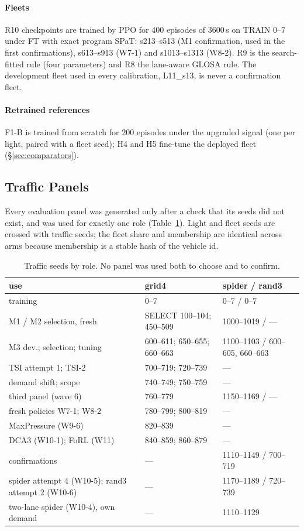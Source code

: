 \paragraph{Fleets} R10 checkpoints are trained by PPO for 400 episodes of 3600\,s on TRAIN 0--7 under FT with exact program SPaT: s213--s513
(M1 confirmation, used in the first confirmations), s613--s913 (W7-1) and s1013--s1313 (W8-2). R9 is the search-fitted rule
(four parameters) and R8 the lane-aware GLOSA rule. The development fleet used in every calibration, L11\_s13, is never a confirmation
fleet.
\paragraph{Retrained references} F1-B is trained from scratch for 200 episodes under the upgraded signal (one per light, paired with a
fleet seed); H4 and H5 fine-tune the deployed fleet (§\ref{sec:comparators}).

\subsection{Traffic Panels}
Every evaluation panel was generated only after a check that its seeds did not exist, and was used for exactly one role
(Table~\ref{tab:panels}). Light and fleet seeds are crossed with traffic seeds; the fleet share and membership are identical across arms
because membership is a stable hash of the vehicle id.
\begin{table}[t]\centering\footnotesize\setlength{\tabcolsep}{2.5pt}
\caption{Traffic seeds by role. No panel was used both to choose and to confirm.}\label{tab:panels}\scriptsize
\begin{tabular}{@{}p{2.45cm}p{2.75cm}p{2.95cm}@{}}\toprule
use & grid4 & spider / rand3\\\midrule
training & 0--7 & 0--7 / 0--7\\
M1 / M2 selection, fresh & SELECT 100--104; 450--509 & 1000--1019 / ---\\
M3 dev.; selection; tuning & 600--611; 650--655; 660--663 & 1100--1103 / 600--605, 660--663\\
TSI attempt 1; TSI-2 & 700--719; 720--739 & ---\\
demand shift; scope & 740--749; 750--759 & ---\\
third panel (wave 6) & 760--779 & 1150--1169 / ---\\
fresh policies W7-1; W8-2 & 780--799; 800--819 & ---\\
MaxPressure (W9-6) & 820--839 & ---\\
DCA3 (W10-1); FoRL (W11) & 840--859; 860--879 & ---\\
confirmations & --- & 1110--1149 / 700--719\\
spider attempt 4 (W10-5); rand3 attempt 2 (W10-6) & --- & 1170--1189 / 720--739\\
two-lane spider (W10-4), own demand & --- & 1110--1129\\\bottomrule
\end{tabular}\end{table}

